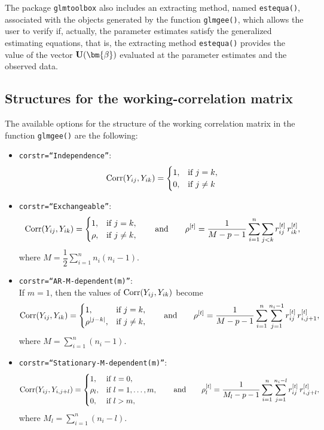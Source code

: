 The package {\tt glmtoolbox} also includes an extracting method, named {\tt estequa()}, associated with the objects generated by the function {\tt glmgee()}, which allows the user to verify if, actually, the parameter estimates satisfy the generalized estimating equations, that is, the extracting method {\tt estequa()} provides the value of the vector ${\bf U}(\bm{\beta})$ evaluated at the parameter estimates and the observed data.

\subsection{Structures for the working-correlation matrix}
The available options for the structure of the working correlation matrix in the function {\tt glmgee()} are the following:
\begin{itemize}
\item {\tt corstr=``Independence''}:\\
$${\rm Corr}(Y_{ij},Y_{ik})=
\begin{cases}
1,    & \text{if }j=k,\\
0, & \text{if }j\neq k
\end{cases}$$

\item {\tt corstr=``Exchangeable''}:
$${\rm Corr}(Y_{ij},Y_{ik})=
\begin{cases}
1,    & \text{if }j=k,\\
\rho, & \text{if }j\neq k,
\end{cases}\qquad\text{and}\qquad
{\rho}^{[t]}=\dfrac{1}{M-p-1}\sum\limits_{i=1}^n\sum\limits_{j<k} r^{[t]}_{ij}\, r^{[t]}_{ik},
$$
where $M=\dfrac{1}{2}\!\sum\limits_{i=1}^n n_i(n_i-1)$.

\item {\tt corstr=``AR-M-dependent(m)''}:\\
If $m=1$, then the values of ${\rm Corr}(Y_{ij},Y_{ik})$ become
$${\rm Corr}(Y_{ij},Y_{ik})=
\begin{cases}
1,    & \text{if }j=k,\\
\rho^{|j-k|}, & \text{if }j\neq k,
\end{cases}\qquad\text{and}\qquad
{\rho}^{[t]}=\dfrac{1}{M-p-1}\sum\limits_{i=1}^n\sum\limits_{j=1}^{n_i-1}r^{[t]}_{ij}\,r^{[t]}_{i,j+1},
$$
where $M=\sum\limits_{i=1}^n (n_i-1)$.
\item {\tt corstr=``Stationary-M-dependent(m)''}:\\
$${\rm Corr}(Y_{ij},Y_{i,j+l})=
\begin{cases}
1,    & \text{if }t=0,\\
\rho_{l}, & \text{if }l=1,\ldots,m,\\
0, & \text{if }l>m,
\end{cases}\qquad\text{and}\qquad
{\rho}^{[t]}_{l}=\dfrac{1}{M_l-p-1}\sum\limits_{i=1}^n\sum\limits_{j=1}^{n_i-l}r^{[t]}_{ij}\,r^{[t]}_{i,j+l},
$$
where $M_l=\sum\limits_{i=1}^n (n_i-l)$.


\end{itemize}
